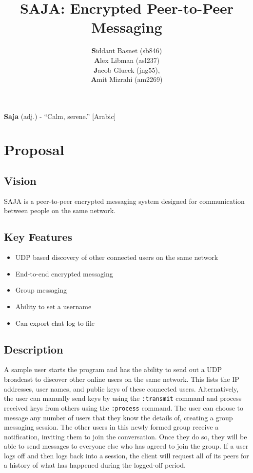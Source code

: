 \documentclass{scrartcl}
\title{SAJA: Encrypted Peer-to-Peer Messaging}
\author{\textbf{S}iddant Basnet (sb846) \\ \textbf{A}lex Libman (asl237)\\ \textbf{J}acob Glueck (jng55), \\ \textbf{A}mit Mizrahi (am2269)}
\date{}
\begin{document}
\maketitle

\textbf{Saja} (adj.) - ``Calm, serene.'' [Arabic]

\section{Proposal}
\subsection{Vision}
SAJA is a peer-to-peer encrypted messaging system designed for communication between people on the same network.

\subsection{Key Features}
\begin{itemize}
	\item UDP based discovery of other connected users on the same network
	\item End-to-end encrypted messaging
	\item Group messaging
	\item Ability to set a username
	\item Can export chat log to file
\end{itemize}

\subsection{Description}
A sample user starts the program and has the ability to send out a UDP broadcast to discover other online users on the same network. This lists the IP addresses, user names, and public keys of these connected users. Alternatively, the user can manually send keys by using the \texttt{:transmit} command and process received keys from others using the \texttt{:process} command. The user can choose to message any number of users that they know the details of, creating a group messaging session. The other users in this newly formed group receive a notification, inviting them to join the conversation. Once they do so, they will be able to send messages to everyone else who has agreed to join the group. If a user logs off and then logs back into a session, the client will request all of its peers for a history of what has happened during the logged-off period.
\end{document}
